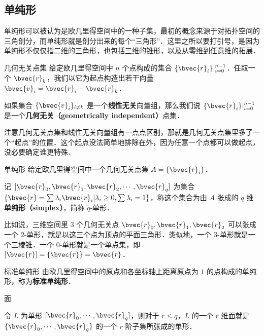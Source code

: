 

\subsection{单纯形}

单纯形可以被认为是欧几里得空间中的一种子集，最初的概念来源于对拓扑空间的三角剖分，而单纯形就是剖分出来的每个“三角形”．这里之所以要打引号，是因为单纯形不仅仅指二维的三角形，也包括三维的锥形，以及从零维到任意维的拓展．

\begin{definition}{几何无关点集}
给定欧几里得空间中 $n$ 个点构成的集合 $\{\bvec{r}_i\}|_{i=0}^{n-1}$．任取一个 $\bvec{r}_k$，我们以它为起点构造出若干向量 $\bvec{v}_i=\bvec{r}_i-\bvec{r}_k$．

如果集合 $\{\bvec{v}_i\}_{i\not= k}$ 是一个\textbf{线性无关}向量组，那么我们说 $\{\bvec{r}_i\}|_{i=0}^{n-1}$ 是一个\textbf{几何无关（geometrically independent）}点集．
\end{definition}

注意几何无关点集和线性无关向量组有一点点区别，那就是几何无关点集里多了一个“起点”的位置．这个起点没法简单地排除在外，因为任意一个点都可以做起点，没必要确定谁更特殊．

\begin{definition}{单纯形}
给定欧几里得空间中一个几何无关点集 $A=\{\bvec{r}_i\}$．

记 $[\bvec{r}_0, \bvec{r}_1, \bvec{r}_2, \cdots, \bvec{r}_q]$ 为集合 $\{\bvec{r}=\sum\lambda_i\bvec{r}_i|\lambda_i\geq 0, \sum\lambda_i=1\}$，称这个集合为由 $A$ 张成的 $q$ 维\textbf{单纯形（simplex）}，简称 $q$-单形．

\end{definition}

比如说，三维空间里 $3$ 个几何无关点 $\bvec{r}_0, \bvec{r}_1, \bvec{r}_2$ 可以张成一个 $2$-单形，就是以这三个点为顶点的平面三角形．类似地，一个 $3$-单形就是一个三棱锥．一个 $0$-单形就是一个单点集，即 $[\bvec{r}]=\{\bvec{r}\}=\bvec{r}$．


\begin{definition}{标准单纯形}
由欧几里得空间中的原点和各坐标轴上距离原点为 $1$ 的点构成的单纯形，称为\textbf{标准单纯形}．
\end{definition}



\begin{definition}{面}

令 $L$ 为单形 $[\bvec{r}_0, \cdots, \bvec{r}_q]$，则对于 $r\leq q$，$L$ 的一个 $r$ 维面就是 $\{\bvec{r}_0, \cdots, \bvec{r}_q\}$ 的一个 $r$ 阶子集所张成的单形．

\end{definition}


